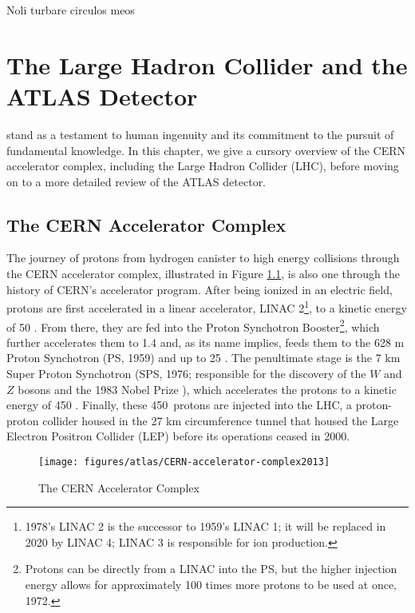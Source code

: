 \begin{savequote}[75mm]
Noli turbare circulos meos
\end{savequote}

\chapter{The Large Hadron Collider and the ATLAS Detector}

 stand as a testament to human ingenuity and its commitment to the pursuit of fundamental knowledge.  In this chapter, we give a cursory overview of the CERN accelerator complex, including the Large Hadron Collider (LHC), before moving on to a more detailed review of the ATLAS detector.

\section{The CERN Accelerator Complex}
The journey of protons from hydrogen canister to high energy collisions through the CERN accelerator complex, illustrated in Figure \ref{fig:cern}, is also one through the history of CERN's accelerator program.  After being ionized in an electric field, protons are first accelerated in a linear accelerator, LINAC 2\footnote{1978's LINAC 2 is the successor to 1959's LINAC 1; it will be replaced in 2020 by LINAC 4; LINAC 3 is responsible for ion production.}, to a kinetic energy of 50 \MeV.  From there, they are fed into the Proton Synchotron Booster\footnote{Protons can be directly from a LINAC into the PS, but the higher injection energy allows for approximately 100 times more protons to be used at once\cite{booster}, 1972.}, which further accelerates them to 1.4 \GeV and, as its name implies, feeds them to the 628 m Proton Synchotron (PS, 1959\cite{ps}) and up to 25 \GeV.  The penultimate stage is the 7 km Super Proton Synchotron (SPS, 1976; responsible for the discovery of the $W$ and $Z$ bosons and the 1983 Nobel Prize \cite{sps}), which accelerates the protons to a kinetic energy of 450 \GeV.  Finally, these 450 \GeV\,protons are injected into the LHC\cite{lhcjinst}, a proton-proton collider housed in the 27 km circumference tunnel that housed the Large Electron Positron Collider (LEP) before its operations ceased in 2000.  

\begin{figure}[!htbp]\captionsetup{justification=centering}
  \centering
  \texttt{[image: figures/atlas/CERN-accelerator-complex2013]}
  \caption{The CERN Accelerator Complex \cite{rings}}
  \label{fig:cern}
\end{figure}


